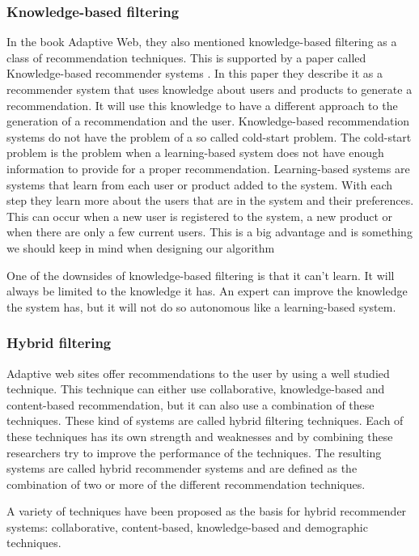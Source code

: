 \documentclass[]{article}
\begin{document}
\subsubsection{Knowledge-based filtering}
In the book Adaptive Web, they also mentioned knowledge-based filtering as a class of recommendation techniques.
This is supported by a paper called Knowledge-based recommender systems \cite{burke2000knowledge}.
In this paper they describe it as a recommender system that uses knowledge about users and products to generate a recommendation.
It will use this knowledge to have a different approach to the generation of a recommendation and the user.
Knowledge-based recommendation systems do not have the problem of a so called cold-start problem.
The cold-start problem is the problem when a learning-based system does not have enough information to provide for a proper recommendation.
Learning-based systems are systems that learn from each user or product added to the system.
With each step they learn more about the users that are in the system and their preferences.
This can occur when a new user is registered to the system, a new product or when there are only a few current users.
This is a big advantage and is something we should keep in mind when designing our algorithm

One of the downsides of knowledge-based filtering is that it can't learn.
It will always be limited to the knowledge it has.
An expert can improve the knowledge the system has, but it will not do so autonomous like a learning-based system.

\subsubsection{Hybrid filtering}
Adaptive web sites offer recommendations to the user by using a well studied technique.
This technique can either use collaborative, knowledge-based and content-based recommendation, but it can also use a combination of these techniques.
These kind of systems are called hybrid filtering techniques.
Each of these techniques has its own strength and weaknesses and by combining these researchers try to improve the performance of the techniques.
The resulting systems are called hybrid recommender systems and are defined as the combination of two or more of the different recommendation techniques.

A variety of techniques have been proposed as the basis for hybrid recommender systems: collaborative, content-based, knowledge-based and demographic techniques.
\end{document}
